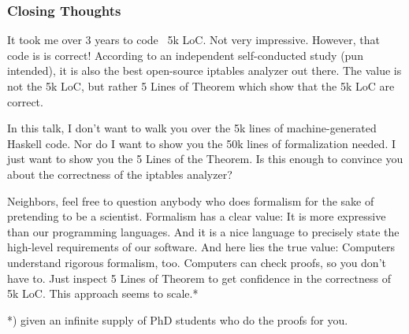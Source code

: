\documentclass[aspectratio=169,t]{beamer}
\begin{document}
\begin{frame}
	\frametitle{Closing Thoughts}
	It took me over 3 years to code ~5k LoC. Not very impressive. However, that code is is correct! According to an independent self-conducted study (pun intended), it is also the best open-source iptables analyzer out there. The value is not the 5k LoC, but rather 5 Lines of Theorem which show that the 5k LoC are correct.

In this talk, I don’t want to walk you over the 5k lines of machine-generated Haskell code. Nor do I want to show you the 50k lines of formalization needed. I just want to show you the 5 Lines of the Theorem. Is this enough to convince you about the correctness of the iptables analyzer?

Neighbors, feel free to question anybody who does formalism for the sake of pretending to be a scientist. Formalism has a clear value: It is more expressive than our programming languages. And it is a nice language to precisely state the high-level requirements of our software. And here lies the true value: Computers understand rigorous formalism, too. Computers can check proofs, so you don’t have to. Just inspect 5 Lines of Theorem to get confidence in the correctness of 5k LoC. This approach seems to scale.*

*) given an infinite supply of PhD students who do the proofs for you.
\end{frame}


\backupend
\end{document}
